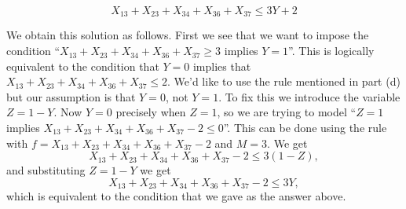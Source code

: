 \begin{parts}
\[ X_{13} + X_{23} + X_{34} + X_{36} + X_{37} \le 3 Y + 2 \]

We obtain this solution as follows. First we see that we want to impose the condition ``$X_{13} + X_{23} + X_{34} + X_{36} + X_{37} \geq 3$ implies $Y=1$''. This is logically equivalent to the condition that $Y = 0$ implies that $X_{13} + X_{23} + X_{34} + X_{36} + X_{37} \leq 2$. We'd like to use the rule mentioned in part (d) but our assumption is that $Y=0$, not $Y=1$. To fix this we introduce the variable $Z = 1-Y$. Now $Y=0$ precisely when $Z=1$, so we are trying to model ``$Z=1$ implies $X_{13} + X_{23} + X_{34} + X_{36} + X_{37} -2 \leq 0$''. This can be done using the rule with $f = X_{13} + X_{23} + X_{34} + X_{36} + X_{37} -2$ and $M = 3.$ We get 
\[ X_{13} + X_{23} + X_{34} + X_{36} + X_{37} -2 \leq 3(1-Z), \]
and substituting $Z = 1-Y$ we get 
\[ X_{13} + X_{23} + X_{34} + X_{36} + X_{37} -2 \leq 3Y, \]
which is equivalent to the condition that we gave as the answer above. 

\vfill

\end{parts}








\newpage




